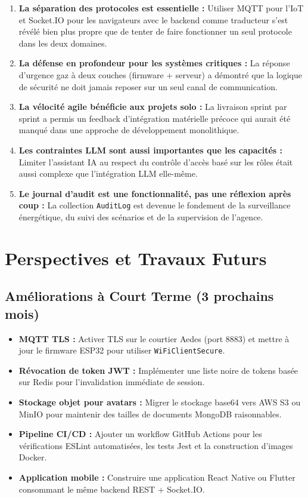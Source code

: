 \begin{enumerate}[leftmargin=1.5cm,itemsep=6pt]
  \item \textbf{La séparation des protocoles est essentielle :} Utiliser MQTT pour l'IoT
        et Socket.IO pour les navigateurs avec le backend comme traducteur s'est révélé
        bien plus propre que de tenter de faire fonctionner un seul protocole dans les
        deux domaines.
  \item \textbf{La défense en profondeur pour les systèmes critiques :} La réponse
        d'urgence gaz à deux couches (firmware + serveur) a démontré que la logique de
        sécurité ne doit jamais reposer sur un seul canal de communication.
  \item \textbf{La vélocité agile bénéficie aux projets solo :} La livraison sprint par
        sprint a permis un feedback d'intégration matérielle précoce qui aurait été manqué
        dans une approche de développement monolithique.
  \item \textbf{Les contraintes LLM sont aussi importantes que les capacités :} Limiter
        l'assistant IA au respect du contrôle d'accès basé sur les rôles était aussi
        complexe que l'intégration LLM elle-même.
  \item \textbf{Le journal d'audit est une fonctionnalité, pas une réflexion après coup :}
        La collection \texttt{AuditLog} est devenue le fondement de la surveillance
        énergétique, du suivi des scénarios et de la supervision de l'agence.
\end{enumerate}

\section{Perspectives et Travaux Futurs}

\subsection{Améliorations à Court Terme (3 prochains mois)}

\begin{itemize}[leftmargin=1.5cm,itemsep=6pt]
  \item \textbf{MQTT TLS :} Activer TLS sur le courtier Aedes (port 8883) et mettre à
        jour le firmware ESP32 pour utiliser \texttt{WiFiClientSecure}.
  \item \textbf{Révocation de token JWT :} Implémenter une liste noire de tokens basée
        sur Redis pour l'invalidation immédiate de session.
  \item \textbf{Stockage objet pour avatars :} Migrer le stockage base64 vers AWS S3 ou
        MinIO pour maintenir des tailles de documents MongoDB raisonnables.
  \item \textbf{Pipeline CI/CD :} Ajouter un workflow GitHub Actions pour les vérifications
        ESLint automatisées, les tests Jest et la construction d'images Docker.
  \item \textbf{Application mobile :} Construire une application React Native ou Flutter
        consommant le même backend REST + Socket.IO.
\end{itemize}


